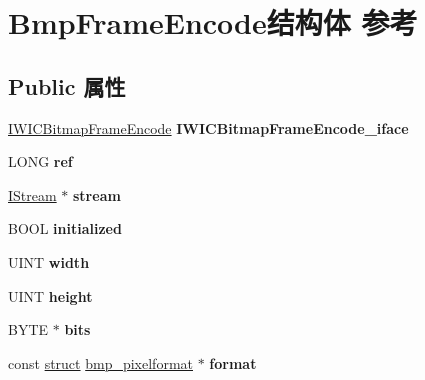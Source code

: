 \hypertarget{struct_bmp_frame_encode}{}\section{Bmp\+Frame\+Encode结构体 参考}
\label{struct_bmp_frame_encode}
\subsection*{Public 属性}
\begin{DoxyCompactItemize}
\item 
\mbox{\label{struct_bmp_frame_encode_ac8bc2e53179f2df8fa151b97587b2a68}} 
\hyperlink{interface_i_w_i_c_bitmap_frame_encode}{I\+W\+I\+C\+Bitmap\+Frame\+Encode} {\bfseries I\+W\+I\+C\+Bitmap\+Frame\+Encode\+\_\+iface}
\item 
\mbox{\label{struct_bmp_frame_encode_af9690acfb6e51262f351cace5b0cf41c}} 
L\+O\+NG {\bfseries ref}
\item 
\mbox{\label{struct_bmp_frame_encode_ab27e7b8fb98833b2333b82737072013a}} 
\hyperlink{interface_i_stream}{I\+Stream} $\ast$ {\bfseries stream}
\item 
\mbox{\label{struct_bmp_frame_encode_a270780ed79cc81b3caaa55d6e1b7d3f0}} 
B\+O\+OL {\bfseries initialized}
\item 
\mbox{\label{struct_bmp_frame_encode_aac730192e68c875725b23a62d3235783}} 
U\+I\+NT {\bfseries width}
\item 
\mbox{\label{struct_bmp_frame_encode_a016defddfdc0dc5cfaf90f7b0555fc02}} 
U\+I\+NT {\bfseries height}
\item 
\mbox{\label{struct_bmp_frame_encode_a88d119c9588164a730330882cca6aaa3}} 
B\+Y\+TE $\ast$ {\bfseries bits}
\item 
\mbox{\label{struct_bmp_frame_encode_a3e6d6de4eab79d8dba0ad77757fe9a57}} 
const \hyperlink{interfacestruct}{struct} \hyperlink{structbmp__pixelformat}{bmp\+\_\+pixelformat} $\ast$ {\bfseries format}
\item 

\end{DoxyCompactItemize}
